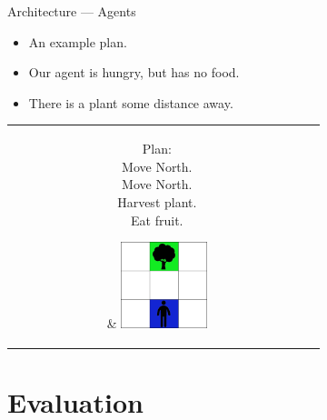    \begin{frame}{Architecture --- Agents}
      \begin{itemize}
         \item An example plan.
         \item Our agent is hungry, but has no food.
         \item There is a plant some distance away.
      \end{itemize}
      
      \medskip
      
      \begin{tabular}{c c}
         \hspace{1cm}\parbox{0.4\textwidth}{\vspace{-3cm}
            Plan:\\
            Move North.\\
            Move North.\\
            Harvest plant.\\
            Eat fruit.\\}
         
         & \includegraphics[width=0.3\textwidth]{hungry_agent.png}
      \end{tabular}
   \end{frame}
   
   \section{Evaluation}
   
